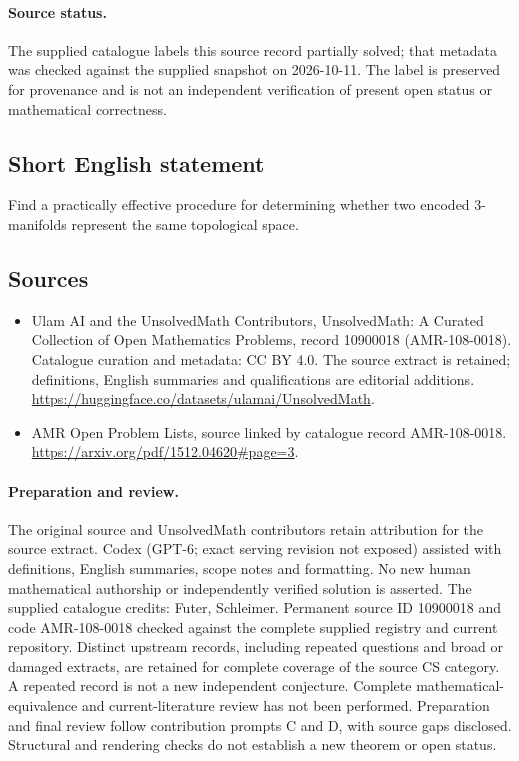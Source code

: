 \documentclass[11pt]{article}
\begin{document}
\paragraph{Source status.}
The supplied catalogue labels this source record partially solved; that metadata was checked against the supplied snapshot on 2026-10-11. The label is preserved for provenance and is not an independent verification of present open status or mathematical correctness.
\subsection{Short English statement}
Find a practically effective procedure for determining whether two encoded 3-manifolds represent the same topological space.
\subsection{Sources}
\begin{itemize}
\item[\hypertarget{source:10900018:1}{S1}] Ulam AI and the UnsolvedMath Contributors, UnsolvedMath: A Curated Collection of Open Mathematics Problems, record 10900018 (AMR-108-0018). Catalogue curation and metadata: CC BY 4.0. The source extract is retained; definitions, English summaries and qualifications are editorial additions.
\url{https://huggingface.co/datasets/ulamai/UnsolvedMath}.
\item[\hypertarget{source:10900018:2}{S2}] AMR Open Problem Lists, source linked by catalogue record AMR-108-0018.
\url{https://arxiv.org/pdf/1512.04620#page=3}.
\end{itemize}
\paragraph{Preparation and review.}
The original source and UnsolvedMath contributors retain attribution for the source extract. Codex (GPT-6; exact serving revision not exposed) assisted with definitions, English summaries, scope notes and formatting. No new human mathematical authorship or independently verified solution is asserted. The supplied catalogue credits: Futer, Schleimer. Permanent source ID 10900018 and code AMR-108-0018 checked against the complete supplied registry and current repository. Distinct upstream records, including repeated questions and broad or damaged extracts, are retained for complete coverage of the source CS category. A repeated record is not a new independent conjecture. Complete mathematical-equivalence and current-literature review has not been performed. Preparation and final review follow contribution prompts C and D, with source gaps disclosed. Structural and rendering checks do not establish a new theorem or open status.
\label{end:10900018}
\end{document}
